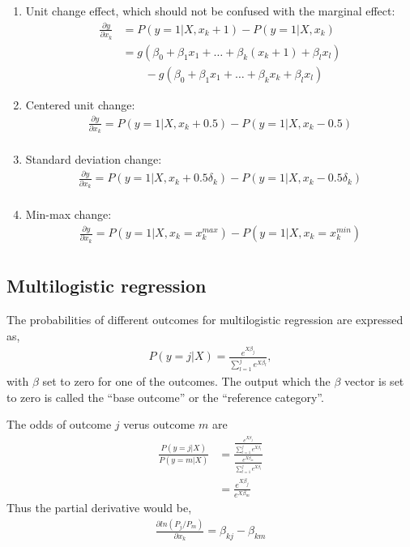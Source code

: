 \begin{enumerate}
  \item Unit change effect, which should not be confused with the
marginal effect:
\begin{align*}
   \frac{\partial y}{\partial x_k} & = P(y=1|X,x_k+1) - P(y=1|X, x_k) \\
                                     & = g(\beta_0 + \beta_1 x_1 + \dots  + \beta_k (x_k+1) + \beta_l x_l) \\
                                    & \qquad  - g(\beta_0 + \beta_1 x_1 + \dots  + \beta_k x_k + \beta_l x_l)
 \end{align*}
    \item Centered unit change:
        \begin{gather*}
          \frac{\partial y}{\partial x_k} = P(y=1|X,x_k+0.5) - P(y=1|X, x_k-0.5) \\
        \end{gather*}
    \item Standard deviation change:
        \begin{gather*}
          \frac{\partial y}{\partial x_k} = P(y=1|X,x_k+0.5\delta_k) - P(y=1|X, x_k-0.5\delta_k) \\
        \end{gather*}
    \item Min-max change:
        \begin{gather*}
          \frac{\partial y}{\partial x_k} = P(y=1|X,x_k=x_k^{max}) - P(y=1|X, x_k=x_k^{min}) \\
        \end{gather*}
\end{enumerate}

\subsection{Multilogistic regression} %
\label{sub:multilogistic_regression}
The probabilities of different outcomes for multilogistic regression are expressed as,
\begin{gather*}
  P(y=j | X)  = \frac{e^{X\beta_j}}{\sum_{l=1}^{j} e^{X\beta_l}},
\end{gather*}
with $\beta$ set to zero for one of the outcomes. The output which the
$\beta$ vector is set to zero is called the ``base outcome'' or the ``reference category''.

The odds of outcome $j$ verus outcome $m$ are
\begin{align*}
  \frac{P(y=j | X)}{P(y=m | X)} & = \frac{\frac{e^{X\beta_j}}{\sum_{l=1}^{j} e^{X\beta_l}}}
                                       {\frac{e^{X\beta_m}}{\sum_{l=1}^{j} e^{X\beta_l}}} \\
                                & = \frac{e^{X\beta_j}}{e^{X\beta_m}}
\end{align*}
Thus the partial derivative would be,
\begin{gather*}
  \frac{\partial ln(P_j/P_m)}{\partial x_k} = \beta_{kj} - \beta_{km}
\end{gather*}

